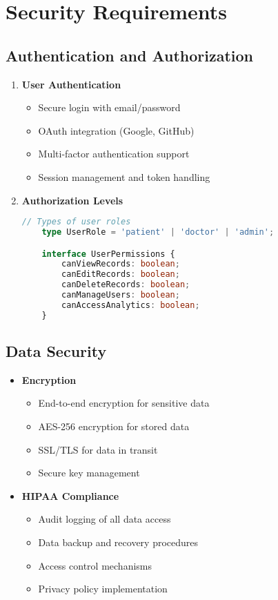 \section{Security Requirements}
\subsection{Authentication and Authorization}
\begin{enumerate}
    \item \textbf{User Authentication}
    \begin{itemize}
        \item Secure login with email/password
        \item OAuth integration (Google, GitHub)
        \item Multi-factor authentication support
        \item Session management and token handling
    \end{itemize}

    \item \textbf{Authorization Levels}
    \begin{lstlisting}[language=typescript]
    // Types of user roles
    type UserRole = 'patient' | 'doctor' | 'admin';

    interface UserPermissions {
        canViewRecords: boolean;
        canEditRecords: boolean;
        canDeleteRecords: boolean;
        canManageUsers: boolean;
        canAccessAnalytics: boolean;
    }
    \end{lstlisting}
\end{enumerate}

\subsection{Data Security}
\begin{itemize}
    \item \textbf{Encryption}
    \begin{itemize}
        \item End-to-end encryption for sensitive data
        \item AES-256 encryption for stored data
        \item SSL/TLS for data in transit
        \item Secure key management
    \end{itemize}

    \item \textbf{HIPAA Compliance}
    \begin{itemize}
        \item Audit logging of all data access
        \item Data backup and recovery procedures
        \item Access control mechanisms
        \item Privacy policy implementation
    \end{itemize}
\end{itemize} 